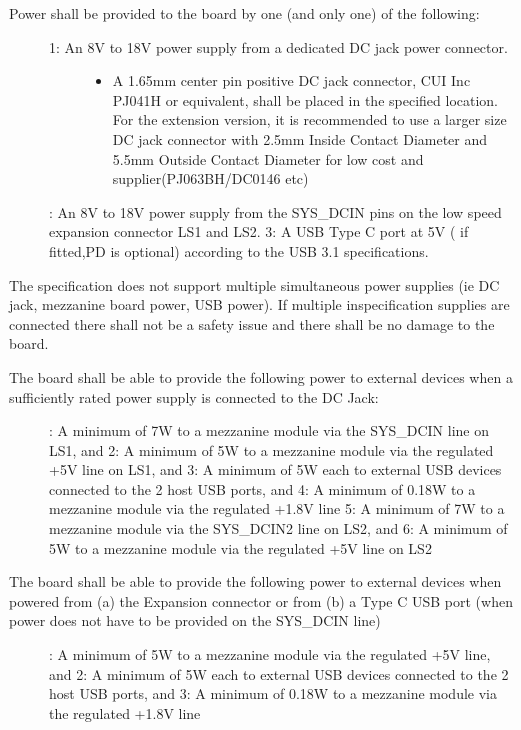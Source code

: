 \documentclass[a4paper,10pt,oneside,english]{sphinxmanual}
\begin{document}
\sphinxAtStartPar
{}
\begin{description}
\item[{Power shall be provided to the board by one (and only one) of the following:}] \leavevmode\begin{description}
\item[{1: An 8V to 18V power supply from a dedicated DC jack power connector.}] \leavevmode\begin{itemize}
\item {} 
\sphinxAtStartPar
A 1.65mm center pin positive DC jack connector, CUI Inc PJ\sphinxhyphen{}041H or equivalent, shall be placed in the specified location. For the extension version, it is recommended to use a larger size DC jack connector with  2.5mm Inside Contact Diameter and 5.5mm Outside Contact Diameter  for low cost and supplier(PJ\sphinxhyphen{}063BH/DC\sphinxhyphen{}0146 etc)

\end{itemize}

\end{description}

: An 8V to 18V power supply from the SYS\_DCIN pins on the low speed expansion connector LS1 and LS2.
3: A USB Type C port at 5V ( if fitted,PD is optional) according to the USB 3.1 specifications.

\end{description}

\sphinxAtStartPar
The specification does not support multiple simultaneous power supplies (ie DC jack, mezzanine board power, USB power). If multiple in\sphinxhyphen{}specification supplies are connected there shall not be a safety issue and there shall be no damage to the board.
\begin{description}
\item[{The board shall be able to provide the following power to external devices when a sufficiently rated power supply is connected to the DC Jack:}] \leavevmode
{}: A minimum of 7W to a mezzanine module via the SYS\_DCIN line on LS1, and
2: A minimum of 5W to a mezzanine module via the regulated +5V line on LS1, and
3: A minimum of 5W each to external USB devices connected to the 2 host USB ports, and
4: A minimum of 0.18W to a mezzanine module via the regulated +1.8V line
5: A minimum of 7W to a mezzanine module via the SYS\_DCIN2 line on LS2, and
6: A minimum of 5W to a mezzanine module via the regulated +5V line on LS2

\item[{The board shall be able to provide the following power to external devices when powered from (a) the Expansion connector or from (b) a Type C USB port (when power does not have to be provided on the SYS\_DCIN line)}] \leavevmode
{}: A minimum of 5W to a mezzanine module via the regulated +5V line, and
2: A minimum of 5W each to external USB devices connected to the 2 host USB ports, and
3: A minimum of 0.18W to a mezzanine module via the regulated +1.8V line

\end{description}
\end{document}
